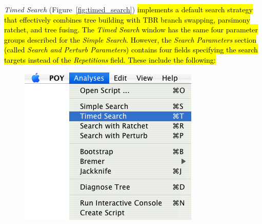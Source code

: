 {\emph{Timed Search} (Figure~\ref{fig:timed_search})\hl{ implements a default search strategy that effectively combines tree building with TBR branch swapping, parsimony ratchet, and tree fusing.  The \emph{Timed Search} window has the same four parameter groups described for the \emph{Simple Search}. However, the \emph{Search Parameters} section (called \emph{Search and Perturb Parameters}) contains four fields specifying the search targets instead of the \emph{Repetitions} field. These include the following:}

\begin{figure}
\centering
\begin{minipage}[c]{0.45\textwidth}
   		\includegraphics[width=\textwidth]{doc/figures/timedsearch_menu.jpg}
\end{minipage}
\,
\begin{minipage}[c]{0.52\textwidth}

\end{minipage}
\end{figure}}
